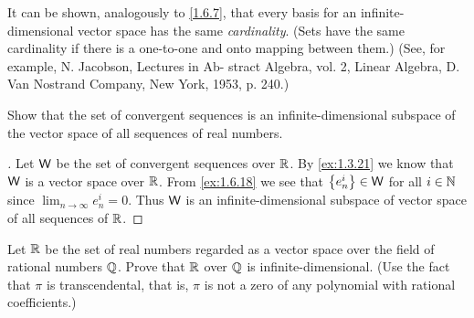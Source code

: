 \begin{note}
	It can be shown, analogously to \cref{1.6.7}, that every basis for an infinite-dimensional vector space has the same \emph{cardinality}.
	(Sets have the same cardinality if there is a one-to-one and onto mapping between them.)
	(See, for example, N. Jacobson, Lectures in Ab- stract Algebra, vol. 2, Linear Algebra, D. Van Nostrand Company, New York, 1953, p. 240.)
\end{note}

\exercisesection

\setcounter{ex}{1}
\begin{ex}\label{ex:1.7.2}
	Show that the set of convergent sequences is an infinite-dimensional subspace of the vector space of all sequences of real numbers.
\end{ex}

\begin{proof}[]
	Let \(\mathsf{W}\) be the set of convergent sequences over \(\mathbb{R}\).
	By \cref{ex:1.3.21} we know that \(\mathsf{W}\) is a vector space over \(\mathbb{R}\).
	From \cref{ex:1.6.18} we see that \(\left\lbrace e_n^i\right\rbrace \in \mathsf{W}\) for all \(i \in \mathbb{N}\) since \(\lim_{n \to \infty} e_n^i = 0\).
	Thus \(\mathsf{W}\) is an infinite-dimensional subspace of vector space of all sequences of \(\mathbb{R}\).
\end{proof}

\begin{ex}\label{ex:1.7.3}
	Let \(\mathbb{R}\) be the set of real numbers regarded as a vector space over the field of rational numbers \(\mathbb{Q}\).
	Prove that \(\mathbb{R}\) over \(\mathbb{Q}\) is infinite-dimensional.
	(Use the fact that \(\pi\) is transcendental, that is, \(\pi\) is not a zero of any polynomial with rational coefficients.)
\end{ex}

